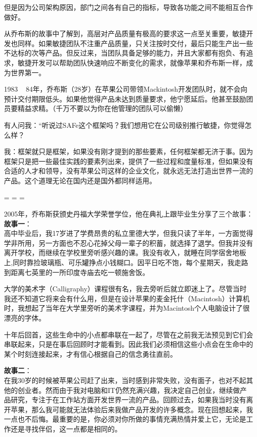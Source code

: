 但是因为公司架构原因，部门之间各有自己的指标，导致各功能之间不能相互合作做好。

从乔布斯的故事中了解到，高层对产品质量有极高的要求这一点至关重要，敏捷开发也同样。如果敏捷团队不注重产品质量，只关注按时交付，最后只能生产出一些不达标的次等产品。但反过来，当团队具备足够的能力，并且大家都有抱负、有追求，敏捷开发可以帮助团队快速响应不断变化的需求，就像苹果和乔布斯一样，成为世界第一。

1983 ~ 
84年，乔布斯（28岁）在苹果公司带领Mackintosh开发团队时，就不会向预计交付期限低头。如果他觉得产品未达到质量要求，他宁愿延后。他甚至鼓励团员要精益求精。（千万不要以为你在他管理的团队可以偷懒）

有人问我：“听说过SAFe这个框架吗？我们想用它在公司级别推行敏捷，你觉得怎么样？

我：框架就只是框架，如果没有刚才提到的那些要素，任何框架都无济于事。因为框架只是把一些最佳实践的要素列出来，提供了一些过程和度量标准，但如果没有合适的人才和领导，没有苹果公司这样的企业文化，就永远无法打造出世界一流的产品。这个道理无论在国内还是国外都同样适用。

\begin{description}
\tightlist
\item[]
= = =
\end{description}

2005年，乔布斯获颁史丹福大学荣誉学位，他在典礼上跟毕业生分享了三个故事：\\
\textbf{故事一}：\\
高中毕业后，我17岁进了学费昂贵的私立里德大学，但我只读了半年，一方面觉得学非所用，另一方面也不忍心花掉父母一辈子的积蓄，就选择了退学。但我并没有离开学校，而继续在学校里旁听感兴趣的课。我没有收入，就睡在同学宿舍地板上,同时靠捡玻璃瓶、可乐罐挣点小钱糊口。因平日吃不饱，每个星期天，我走路到距离七英里的一所印度寺庙去吃一顿施舍饭。

大学的美术字（Calligraphy）课程很有名，我去旁听后就立即迷上了。尽管当时我还不知道它将来会有什么用，但是在设计苹果的麦金托什（Macintosh）计算机时，我想起了当年在大学里旁听的美术字课程，并为Macintosh个人电脑设计了很漂亮的字体。

十年后回首，这些生命中的小点都串联在一起了，尽管在之前我无法预见到它们会串联起来，只是在事后回顾时才能看到。因此我们必须相信这些小点会在生命中的某个时刻连接起来，才有信心根据自己的信念勇往直前。 

\textbf{故事二}：\\
在我30岁的时候被苹果公司赶了出来，当时感到非常失败，没有面子，也对不起其他的创业者。然而由于我对电脑和IT仍然充满兴趣，我决定自己创业，继续做产品研究，专注于在工作站方面开发世界一流的产品。回顾过去，如果我当时没有离开苹果，那么我可能就无法体验后来我做产品开发的许多概念。现在回想起来，我一点也不后悔。最重要的是，你必须对你所做的事情充满热情并爱上它，无论是工作还是寻找伴侣，这一点都是相同的。

